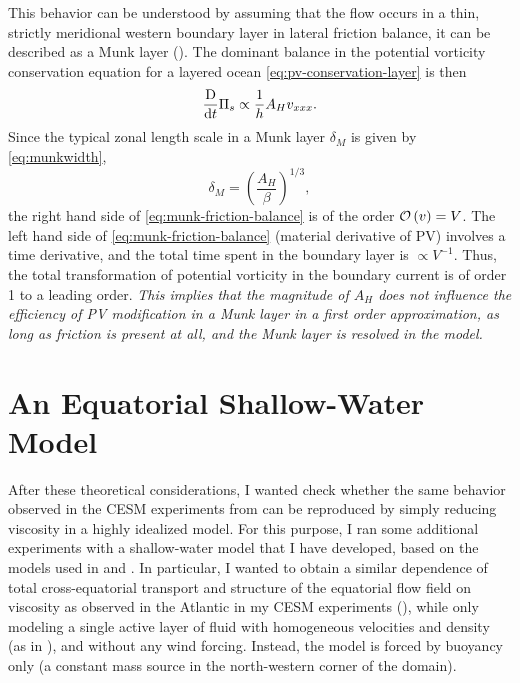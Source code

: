 This behavior can be understood by assuming that the flow occurs in a thin, strictly meridional western boundary layer in lateral friction balance, \ie it can be described as a Munk layer (\cf {}). The dominant balance in the potential vorticity conservation equation for a layered ocean \eqref{eq:pv-conservation-layer} is then
%
\begin{equation} 
\frac{\text{D}}{\text{d}t} \Pi_s \propto \frac{1}{h} A_H v_{xxx}. \label{eq:munk-friction-balance}
\end{equation}
%
Since the typical zonal length scale in a Munk layer \(\delta_M\) is given by \eqref{eq:munkwidth}, \ie
%
\begin{equation}
\delta_M = \left(\frac{A_H}{\beta}\right)^{1/3},
\end{equation}
%
the right hand side of \eqref{eq:munk-friction-balance} is of the order \(\mathcal{O}\left(v\right) = V\). The left hand side of \eqref{eq:munk-friction-balance} (material derivative of \ac{PV}) involves a time derivative, and the total time spent in the boundary layer is \(\propto V^{-1}\). Thus, the total transformation of potential vorticity in the boundary current is of order \num{1} to a leading order. \emph{This implies that the magnitude of \(A_H\) does not influence the efficiency of \ac{PV} modification in a Munk layer in a first order approximation, as long as friction is present at all, and the Munk layer is resolved in the model.}

\clearpage
\section{An Equatorial Shallow-Water Model}
\label{sec:equatorial-shallow-water}
After these theoretical considerations, I wanted check whether the same behavior observed in the \acs{CESM} experiments from  can be reproduced by simply reducing viscosity in a highly idealized model. For this purpose, I ran some additional experiments with a shallow-water model that I have developed, based on the models used in \cite{killworth} and \cite{kawase}. In particular, I wanted to obtain a similar dependence of total cross-equatorial transport and structure of the equatorial flow field on viscosity as observed in the Atlantic in my \ac{CESM} experiments (), while only modeling a single active layer of fluid with homogeneous velocities and density (as in ), and without any wind forcing. Instead, the model is forced by buoyancy only (a constant mass source in the north-western corner of the domain).

